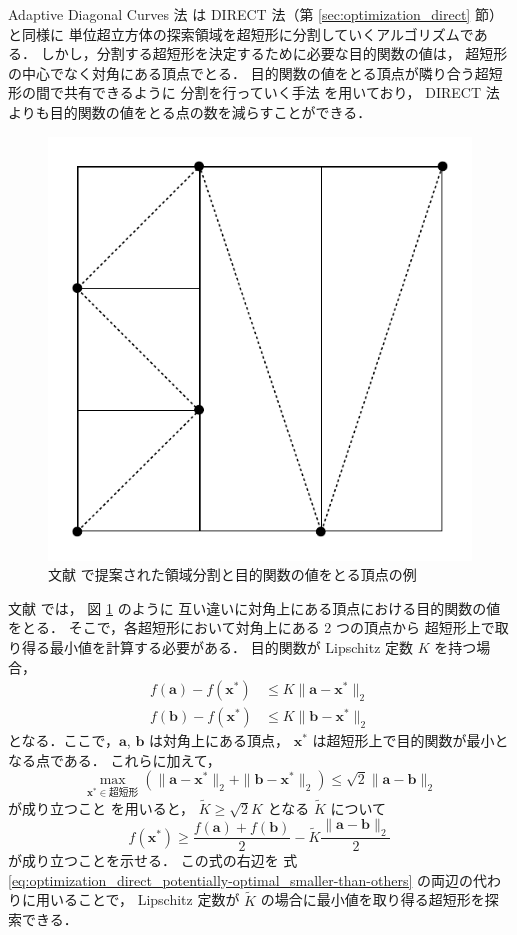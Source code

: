 Adaptive Diagonal Curves 法 \cite{Sergeyev2006} は
DIRECT 法（第 \ref{sec:optimization_direct} 節）と同様に
単位超立方体の探索領域を超短形に分割していくアルゴリズムである．
しかし，分割する超短形を決定するために必要な目的関数の値は，
超短形の中心でなく対角にある頂点でとる．
目的関数の値をとる頂点が隣り合う超短形の間で共有できるように
分割を行っていく手法 \cite{Sergeyev2000} を用いており，
DIRECT 法よりも目的関数の値をとる点の数を減らすことができる．

\begin{figure}[tp]
    \centering
    \includegraphics[width=0.7\linewidth]{optimization/ADC-partitions-image.pdf}
    \caption{文献 \cite{Sergeyev2000} で提案された領域分割と目的関数の値をとる頂点の例}
    \label{fig:optimization_adc_partitions-image}
\end{figure}

文献 \cite{Sergeyev2000} では，
図 \ref{fig:optimization_adc_partitions-image} のように
互い違いに対角上にある頂点における目的関数の値をとる．
そこで，各超短形において対角上にある 2 つの頂点から
超短形上で取り得る最小値を計算する必要がある．
目的関数が Lipschitz 定数 $K$ を持つ場合，
\begin{align}
    f(\bm{a}) - f(\bm{x}^*) & \le K \|\bm{a} - \bm{x}^*\|_2 \\
    f(\bm{b}) - f(\bm{x}^*) & \le K \|\bm{b} - \bm{x}^*\|_2
\end{align}
となる．ここで，$\bm{a}$, $\bm{b}$ は対角上にある頂点，
$\bm{x}^*$ は超短形上で目的関数が最小となる点である．
これらに加えて，
\begin{equation}
    \max_{\bm{x}^* \in \text{超短形}}{(\|\bm{a} - \bm{x}^*\|_2 + \|\bm{b} - \bm{x}^*\|_2)} \le \sqrt{2} \|\bm{a} - \bm{b}\|_2
\end{equation}
が成り立つこと \cite[Lemma 2.]{Molinaro2001} を用いると，
$\tilde{K} \ge \sqrt{2} K$ となる $\tilde{K}$ について
\begin{equation}
    f(\bm{x}^*) \ge \frac{f(\bm{a}) + f(\bm{b})}{2} - \tilde{K} \frac{\|\bm{a} - \bm{b}\|_2}{2}
\end{equation}
が成り立つことを示せる\cite[Theorem 2.1]{Sergeyev2006}．
この式の右辺を
式 \eqref{eq:optimization_direct_potentially-optimal_smaller-than-others}
の両辺の代わりに用いることで，
Lipschitz 定数が $\tilde{K}$ の場合に最小値を取り得る超短形を探索できる．
